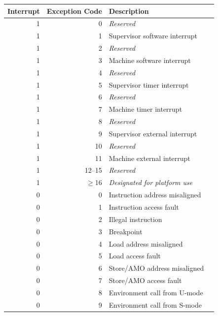 \begin{table}[htbp]
\begin{center}
\begin{tabular}{|r|r|l|l|}

  \hline
  Interrupt & Exception Code  & Description \\
  \hline
  1         & 0               & {\em Reserved} \\
  1         & 1               & Supervisor software interrupt \\
  1         & 2               & {\em Reserved} \\
  1         & 3               & Machine software interrupt \\ \hline
  1         & 4               & {\em Reserved} \\
  1         & 5               & Supervisor timer interrupt \\
  1         & 6               & {\em Reserved} \\
  1         & 7               & Machine timer interrupt \\ \hline
  1         & 8               & {\em Reserved} \\
  1         & 9               & Supervisor external interrupt \\
  1         & 10              & {\em Reserved} \\
  1         & 11              & Machine external interrupt \\ \hline
  1         & 12--15          & {\em Reserved} \\
  1         & $\ge$16         & {\em Designated for platform use} \\ \hline
  0         & 0               & Instruction address misaligned \\
  0         & 1               & Instruction access fault \\
  0         & 2               & Illegal instruction \\
  0         & 3               & Breakpoint \\
  0         & 4               & Load address misaligned \\
  0         & 5               & Load access fault \\
  0         & 6               & Store/AMO address misaligned \\
  0         & 7               & Store/AMO access fault \\
  0         & 8               & Environment call from U-mode\\
  0         & 9               & Environment call from S-mode \\

\end{tabular}
\end{center}
\end{table}
